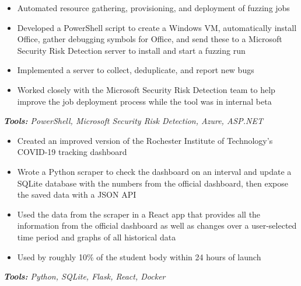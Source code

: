 \documentclass[10pt,letter]{altacv}
\begin{document}
\begin{itemize}
\item Automated resource gathering, provisioning, and deployment of fuzzing jobs
\item Developed a PowerShell script to create a Windows VM, automatically install Office, gather debugging symbols for Office, and send these to a Microsoft \\ Security Risk Detection server to install and start a fuzzing run
\item Implemented a server to collect, deduplicate, and report new bugs
\item Worked closely with the Microsoft Security Risk Detection team to help improve the job deployment process while the tool was in internal beta
\end{itemize}
\textit{\textbf{Tools:} PowerShell, Microsoft Security Risk Detection, Azure, ASP.NET}

\medskip 




\begin{itemize}
\item Created an improved version of the Rochester Institute of Technology's COVID-19 tracking dashboard
\item Wrote a Python scraper to check the dashboard on an interval and update a SQLite database with the numbers from the official dashboard, then expose the saved data with a JSON API
\item Used the data from the scraper in a React app that provides all the information from the official dashboard as well as changes over a user-selected time period and graphs of all historical data
\item Used by roughly 10\% of the student body within 24 hours of launch
\end{itemize}
\textit{\textbf{Tools:} Python, SQLite, Flask, React, Docker}
\end{document}
